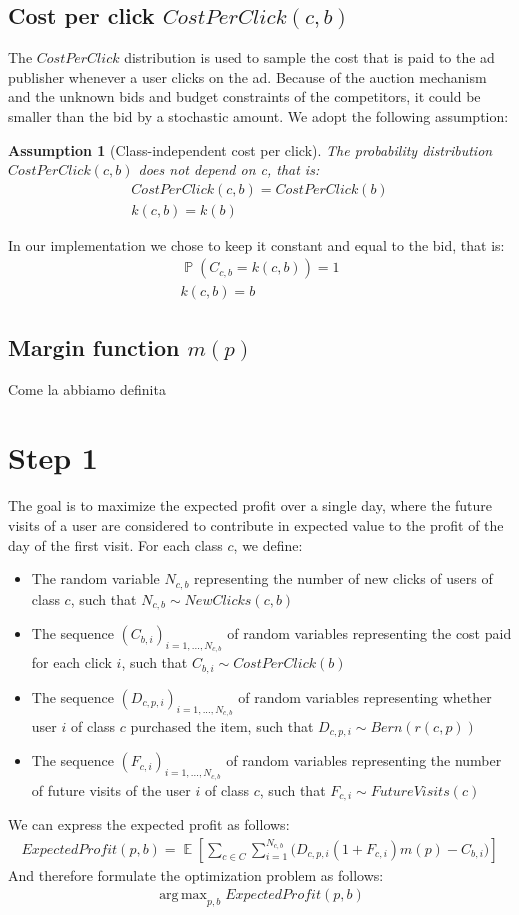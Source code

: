\documentclass[11pt]{article} %
\DeclareMathOperator{\EX}{\mathbb{E}}
\DeclareMathOperator{\Prob}{\mathbb{P}}
\DeclareMathOperator*{\argmax}{arg\,max}
\newtheorem*{assumption}{Assumption}
\begin{document}
\subsection{Cost per click $CostPerClick(c,b)$}
The $CostPerClick$ distribution is used to sample the cost that is paid to the ad publisher whenever a user clicks on the ad. Because of the  auction mechanism and the unknown bids and budget constraints of the competitors, it could be smaller than the bid by a stochastic amount.
We adopt the following assumption: 
\begin{assumption}[Class-independent cost per click] The probability distribution $CostPerClick(c,b)$ does not depend on c, that is:
\begin{align*}
CostPerClick(c,b)=CostPerClick(b)\\
k(c,b) = k(b)
\end{align*}
\end{assumption}
In our implementation we chose to keep it constant and equal to the bid, that is:
\begin{align*}
\Prob(C_{c,b} = k(c,b)) = 1\\
k(c,b) = b
\end{align*}
\subsection{Margin function $m(p)$}
{\color{red}Come la abbiamo definita}
\section{Step 1}
The goal is to maximize the expected profit over a single day, where the future visits of a user are considered to contribute in expected value to the profit of the day of the first visit.
\newline
\newline
For each class $c$, we define:
\begin{itemize}
\item The random variable $N_{c,b}$ representing the number of new clicks of users of class $c$, such that $N_{c,b} \sim NewClicks(c,b)$
\item The sequence $(C_{b,i})_{i=1,...,N_{c,b}}$ of random variables representing the cost paid for each click $i$, such that $C_{b,i}\sim CostPerClick(b)$
\item The sequence $(D_{c,p,i})_{i=1,...,N_{c,b}}$ of random variables representing whether user $i$ of class $c$ purchased the item, such that $D_{c,p,i}\sim Bern(r(c,p))$
\item The sequence $(F_{c,i})_{i=1,...,N_{c,b}}$ of random variables representing the number of future visits of the user $i$ of class $c$, such that $F_{c,i}\sim FutureVisits(c)$
\end{itemize}
We can express the expected profit as follows:
\begin{align*}
ExpectedProfit(p,b) = \EX\left[\sum_{c \in C}{\sum_{i =1}^{N_{c,b}}{\bigg( D_{c,p,i}(1+F_{c,i})m(p)-C_{b,i}\bigg)}}\right]
\end{align*}
And therefore formulate the optimization problem as follows:
\begin{align*}
\argmax_{p,b}{ExpectedProfit(p,b)}
\end{align*}
\end{document}
